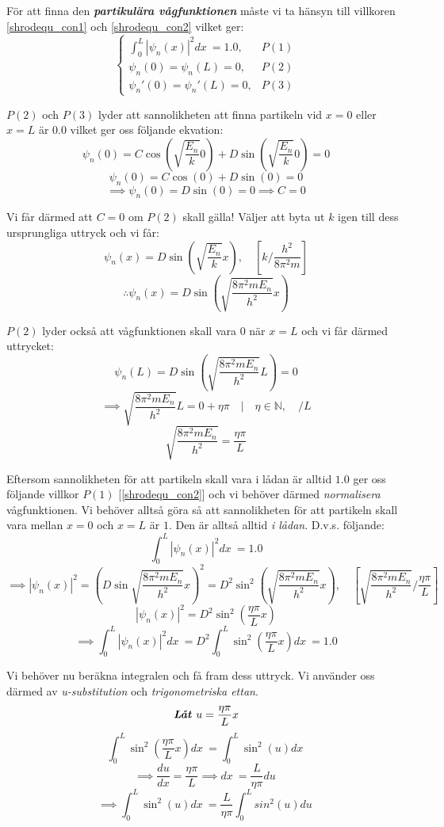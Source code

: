 \documentclass{article}
\newcommand{\shrodprob}{|\psi_n(x)|^2}
\begin{document}
För att finna den \textbf{\emph{partikulära vågfunktionen}} måste vi ta hänsyn till villkoren \ref{shrodequ_con1} och \ref{shrodequ_con2} vilket ger:
$$
\begin{cases}
	\int_0^L \shrodprob dx\ = 1.0, & P(1) \\
	\psi_n(0) = \psi_n(L) = 0, & P(2) \\
	\psi_n'(0) = \psi_n'(L) = 0, & P(3) 
\end{cases}
$$

$P(2)$ och $P(3)$ lyder att sannolikheten att finna partikeln vid $x=0$ eller $x=L$ är $0.0$ vilket ger oss följande ekvation:
$$
\psi_n(0) = C \cos \left(\sqrt{\frac{E_n}{k}}0\right) + D \sin \left(\sqrt{\frac{E_n}{k}}0\right) = 0
$$
$$
\psi_n(0) = C \cos \left(0\right) + D \sin \left(0\right) = 0
$$
$$
\implies \psi_n(0) = D \sin \left(0\right) = 0 \implies C = 0
$$

Vi får därmed att $C=0$ om $P(2)$ skall gälla! Väljer att byta ut $k$ igen till dess ursprungliga uttryck och vi får:
$$
\psi_n(x) = D \sin \left(\sqrt{\frac{E_n}{k}} x \right), \quad \left[k/\frac{h^2}{8 \pi ^2 m}\right]
$$
$$
\therefore \psi_n(x) = D \sin \left( \sqrt{\frac{8 \pi^2 m E_n}{h^2}} x \right)
$$

$P(2)$ lyder också att vågfunktionen skall vara $0$ när $x=L$ och vi får därmed uttrycket:
$$
\psi_n(L) = D \sin \left( \sqrt{\frac{8 \pi^2 m E_n}{h^2}} L \right) = 0
$$
$$
\implies \sqrt{\frac{8 \pi^2 m E_n}{h^2}} L = 0 + \eta\pi \quad | \quad \eta \in \mathbb{N}, \quad /L
$$
\begin{equation} \label{coeff_eq}
\sqrt{\frac{8 \pi^2 m E_n}{h^2}} = \frac{\eta\pi}{L}
\end{equation}

Eftersom sannolikheten för att partikeln skall vara i lådan är alltid $1.0$ ger oss följande villkor $P(1)$ [\ref{shrodequ_con2}] och vi behöver därmed \emph{normalisera} vågfunktionen. Vi behöver alltså göra så att sannolikheten för att partikeln skall vara mellan $x=0$ och $x=L$ är $1$. Den är alltså alltid \emph{i lådan}. D.v.s. följande:
$$
\int_0^L \shrodprob dx\ = 1.0
$$
$$
\implies \shrodprob = \left( D\sin \sqrt{\frac{8 \pi^2 m E_n}{h^2}}x \right)^2
= D^2 \sin^2 \left( \sqrt{\frac{8 \pi^2 m E_n}{h^2}}x \right), \quad \left[ \sqrt{\frac{8 \pi^2 m E_n}{h^2}} / \frac{\eta\pi}{L} \right]
$$
$$
\shrodprob = D^2 \sin^2 \left( \frac{\eta\pi}{L} x \right)
$$
$$
\implies \int_0^L \shrodprob dx\ = D^2 \int_0^L \sin^2\left( \frac{\eta\pi}{L} x \right) dx\ = 1.0
$$

Vi behöver nu beräkna integralen och få fram dess uttryck. Vi använder oss därmed av \emph{u-substitution} och \emph{trigonometriska ettan}. 
$$
\textbf{\emph{Låt $u = \frac{\eta\pi}{L}x$}}
$$
$$
\int_0^L \sin^2\left( \frac{\eta\pi}{L} x \right) dx\ = \int_0^L \sin^2(u) dx\
$$
$$
\implies \frac{du}{dx} = \frac{\eta\pi}{L} \implies dx\ = \frac{L}{\eta\pi} du\
$$
$$
\implies \int_0^L \sin^2(u) dx\ = \frac{L}{\eta\pi} \int_0^L sin^2(u) du\
$$
\end{document}
